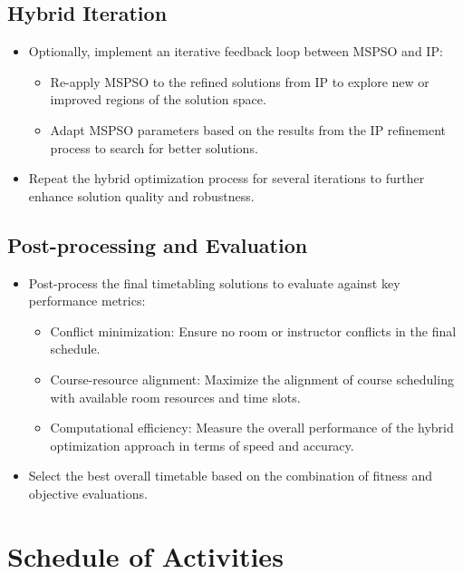\documentclass{article}
\begin{document}
\subsection{Hybrid Iteration}
\label{subsec
} \begin{itemize} \item Optionally, implement an iterative feedback loop between MSPSO and IP: \begin{itemize} \item Re-apply MSPSO to the refined solutions from IP to explore new or improved regions of the solution space. \item Adapt MSPSO parameters based on the results from the IP refinement process to search for better solutions. \end{itemize} \item Repeat the hybrid optimization process for several iterations to further enhance solution quality and robustness. \end{itemize}

\subsection{Post-processing and Evaluation}
\label{subsec
} \begin{itemize} \item Post-process the final timetabling solutions to evaluate against key performance metrics: \begin{itemize} \item Conflict minimization: Ensure no room or instructor conflicts in the final schedule. \item Course-resource alignment: Maximize the alignment of course scheduling with available room resources and time slots. \item Computational efficiency: Measure the overall performance of the hybrid optimization approach in terms of speed and accuracy. \end{itemize} \item Select the best overall timetable based on the combination of fitness and objective evaluations. 
\end{itemize}

\section{Schedule of Activities}
\label{sec:schedule}



\printbibliography 
\end{document}
